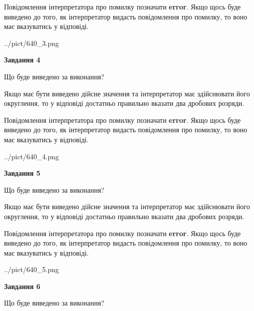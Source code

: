 \documentclass[12pt, ukrainian]{article}
\begin{document}
{\begin {Large}
Повідомлення інтерпретатора про помилку позначати \textbf{error}.
Якщо щось буде виведено до того, як інтерпретатор видасть повідомлення про помилку, 
то воно має вказуватись у відповіді. \par

\begin{center}
	{../pict/640_3.png}
\end{center}
\newpage

{\begin {center}\textbf{Завдання 4}\end {center}}\par
Що буде виведено за виконання? \par

Якщо має бути виведено дійсне значення та інтерпретатор має здійснювати його округлення, 
то у відповіді достатньо правильно вказати два дробових розряди.

Повідомлення інтерпретатора про помилку позначати \textbf{error}.
Якщо щось буде виведено до того, як інтерпретатор видасть повідомлення про помилку, 
то воно має вказуватись у відповіді. \par

\begin{center}
	{../pict/640_4.png}
\end{center}
\newpage

{\begin {center}\textbf{Завдання 5}\end {center}}\par
Що буде виведено за виконання? \par

Якщо має бути виведено дійсне значення та інтерпретатор має здійснювати його округлення, 
то у відповіді достатньо правильно вказати два дробових розряди.

Повідомлення інтерпретатора про помилку позначати \textbf{error}.
Якщо щось буде виведено до того, як інтерпретатор видасть повідомлення про помилку, 
то воно має вказуватись у відповіді. \par

\begin{center}
	{../pict/640_5.png}
\end{center}
\newpage

{\begin {center}\textbf{Завдання 6}\end {center}}\par
Що буде виведено за виконання? \par


\end{Large}}
\end{document}

